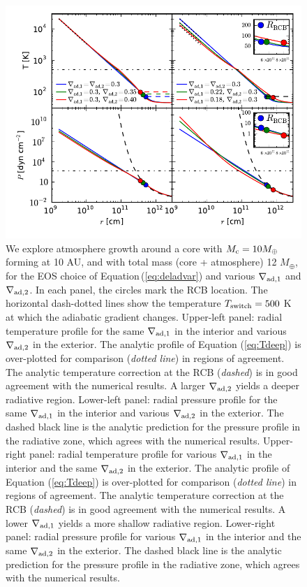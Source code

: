 \documentclass[apj]{emulateapj}
\newcommand{\Eq}[1]{Equation\,(\ref{#1})}
\newcommand{\co}{_{\rm c}}
\begin{document}
\begin{figure}[tb]
\centering
\includegraphics[width=\textwidth]{../../figs/ModelAtmospheres/RadSelfGravRealEOS/PaperFigs/varying_delad_4panel_3.pdf}
\caption{We explore atmosphere growth around a core with $M\co=10 M_{\oplus}$ forming at 10 AU, and with total mass (core + atmosphere) 12 $M_{\oplus}$, for the EOS choice of \Eq{eq:deladvar} and various $\nabla_{\rm ad,1}$ and $\nabla_{\rm ad,2}$. In each panel, the circles mark the RCB location. The horizontal dash-dotted lines show the temperature $T_{\rm switch}=500$ K at which the adiabatic gradient changes. Upper-left panel: radial temperature profile for the same $\nabla_{\rm ad,1}$ in the interior and various $\nabla_{\rm ad,2}$ in the exterior. The analytic profile of Equation (\ref{eq:Tdeep}) is over-plotted for comparison (\textit{dotted line}) in regions of agreement. The analytic temperature correction at the RCB (\textit{dashed}) is in good agreement with the numerical results. A larger $\nabla_{\rm ad,2}$ yields a deeper radiative region.  Lower-left panel: radial pressure profile for the same $\nabla_{\rm ad,1}$ in the interior and various $\nabla_{\rm ad,2}$ in the exterior. The dashed black line is the analytic prediction for the pressure profile in the radiative zone, which agrees with the numerical results. Upper-right panel: radial temperature profile for various $\nabla_{\rm ad,1}$ in the interior and the same $\nabla_{\rm ad,2}$ in the exterior. The analytic profile of Equation (\ref{eq:Tdeep}) is over-plotted for comparison (\textit{dotted line}) in regions of agreement. The analytic temperature correction at the RCB (\textit{dashed}) is in good agreement with the numerical results. A lower $\nabla_{\rm ad,1}$ yields a more shallow radiative region. Lower-right panel: radial pressure profile for various $\nabla_{\rm ad,1}$ in the interior and the same $\nabla_{\rm ad,2}$ in the exterior. The dashed black line is the analytic prediction for the pressure profile in the radiative zone, which agrees with the numerical results.}
\label{fig:varying_delad}
\end{figure}
\end{document}

